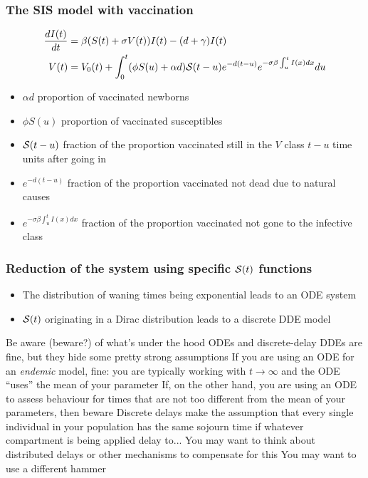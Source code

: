 \documentclass[aspectratio=169]{beamer}\usepackage[]{graphicx}\usepackage[]{xcolor}
\begin{document}
\begin{frame}\frametitle{The SIS model with vaccination} 
\begin{subequations}\label{sys:SIVS_general}
\begin{align}
  \frac{dI(t)}{dt}&= \beta(S(t)+\sigma V(t))I(t)-(d+\gamma)I(t)
  \label{sys:SIVS_general_I}\\ 
  V(t)&= V_0(t)  
  +\int_0^t(\phi S(u)+\alpha d)\S(t-u)e^{-d(t-u)}
  e^{-\sigma\beta\int_u^tI(x)dx}du \label{sys:SIVS_general_V}
\end{align}
\end{subequations}
\vfill
\begin{itemize}
\item $\alpha d$ proportion of vaccinated newborns
\item $\phi S(u)$ proportion of vaccinated susceptibles
\item $\S(t-u)$ fraction of the proportion vaccinated still in the $V$
  class $t-u$ time units after going in
\item $e^{-d(t-u)}$ fraction of the proportion vaccinated
not dead due to natural causes
\item $e^{-\sigma\beta\int_u^t I(x)dx}$ fraction of the proportion
  vaccinated not gone to the infective class
\end{itemize} 
\end{frame}

\begin{frame}\frametitle{Reduction of the system using specific $\S(t)$ functions}
\vfill
\begin{itemize}
\item The distribution of waning times being exponential leads to
 an ODE system
\vfill
\item $\S(t)$ originating in a Dirac distribution leads to a discrete DDE model
\end{itemize}
\end{frame}


\begin{frame}{Be aware (beware?) of what's under the hood}
ODEs and discrete-delay DDEs are fine, but they hide some pretty strong assumptions
\vfill
If you are using an ODE for an \emph{endemic} model, fine: you are typically working with $t\to\infty$ and the ODE ``uses'' the mean of your parameter
\vfill
If, on the other hand, you are using an ODE to assess behaviour for times that are not too different from the mean of your parameters, then beware
\vfill
Discrete delays make the assumption that every single individual in your population has the same sojourn time if whatever compartment is being applied delay to... You may want to think about distributed delays or other mechanisms to compensate for this
\vfill
You may want to use a different hammer 
\end{frame}
\end{document}

